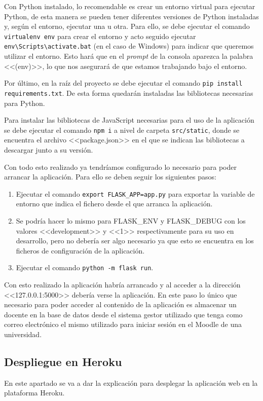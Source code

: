 Con Python instalado, lo recomendable es crear un entorno virtual para ejecutar Python, de esta manera se pueden tener diferentes versiones de Python instaladas y, según el entorno, ejecutar una u otra.
Para ello, se debe ejecutar el comando \texttt{virtualenv env} para crear el entorno y acto seguido ejecutar \texttt{env\textbackslash{}Scripts\textbackslash{}activate.bat} (en el caso de Windows) para indicar que queremos utilizar el entorno.
Esto hará que en el \textit{prompt} de la consola aparezca la palabra <<(env)>>, lo que nos asegurará de que estamos trabajando bajo el entorno.

Por último, en la raíz del proyecto se debe ejecutar el comando \texttt{pip install requirements.txt}.
De esta forma quedarán instaladas las bibliotecas necesarias para Python.

Para instalar las bibliotecas de JavaScript necesarias para el uso de la aplicación se debe ejecutar el comando \texttt{npm i} a nivel de carpeta \texttt{src/static}, donde se encuentra el archivo <<package.json>> en el que se indican las bibliotecas a descargar junto a su versión. 

Con todo esto realizado ya tendríamos configurado lo necesario para poder arrancar la aplicación.
Para ello se deben seguir los siguientes pasos:
\begin{enumerate}
\item Ejecutar el comando \texttt{export FLASK\_APP=app.py} para exportar la variable de entorno que indica el fichero desde el que arranca la aplicación.
\item Se podría hacer lo mismo para FLASK\_ENV y FLASK\_DEBUG con los valores <<development>> y <<1>> respectivamente para su uso en desarrollo, pero no debería ser algo necesario ya que esto se encuentra en los ficheros de configuración de la aplicación.
\item Ejecutar el comando \texttt{python -m flask run}.
\end{enumerate}

Con esto realizado la aplicación habría arrancado y al acceder a la dirección <<127.0.0.1:5000>> debería verse la aplicación.
En este paso lo único que necesario para poder acceder al contenido de la aplicación es almacenar un docente en la base de datos desde el sistema gestor utilizado que tenga como correo electrónico el mismo utilizado para iniciar sesión en el Moodle de una universidad.

\subsection{Despliegue en Heroku}
En este apartado se va a dar la explicación para desplegar la aplicación web en la plataforma Heroku.

